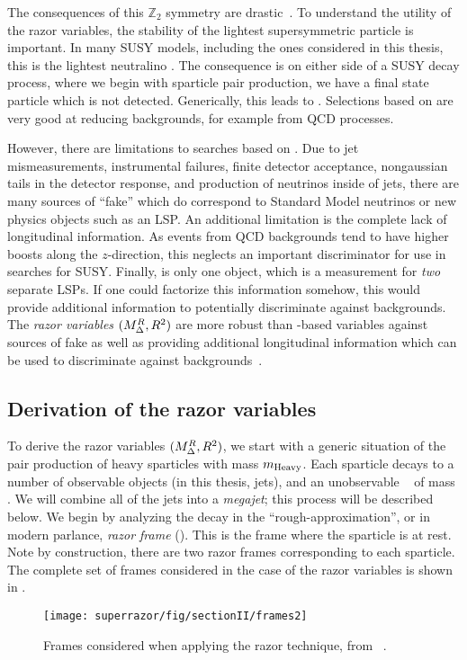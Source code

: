 The consequences of this $\mathbb{Z}_2$ symmetry are drastic~\cite{susyPrimer}.
To understand the utility of the razor variables, the stability of the lightest supersymmetric particle is important.
In many SUSY models, including the ones considered in this thesis, this is the lightest neutralino \lsp.
The consequence is on either side of a SUSY decay process, where we begin with sparticle pair production, we have a final state particle which is not detected.
Generically, this leads to \met.
Selections based on \met are very good at reducing  backgrounds, for example from QCD processes.

However, there are limitations to searches based on \met.
Due to jet mismeasurements, instrumental failures, finite detector acceptance, nongaussian tails in the detector response, and production of neutrinos inside of jets, there are many sources of ``fake'' \met which do correspond to Standard Model neutrinos or new physics objects such as an LSP.
An additional limitation is the complete lack of longitudinal information.
As events from QCD backgrounds tend to have higher boosts along the $z$-direction, this neglects an important discriminator for use in searches for SUSY.
Finally, \met is only one object, which is a measurement for \textit{two} separate LSPs.
If one could factorize this information somehow, this would provide additional information to potentially discriminate against backgrounds.
The \textit{razor variables} $(M_{\Delta}^{R}, R^2)$ are more robust than \met-based variables against sources of fake \met as well as providing additional longitudinal information which can be used to discriminate against backgrounds~\cite{Rogan:2010kb,Buckley:2013kua}.

\subsection{Derivation of the razor variables}

To derive the razor variables $(M_{\Delta}^{R}, R^2)$, we start with a generic situation of the pair production of heavy sparticles with mass $m_{\mathrm{Heavy}}$.\footnotemark
{}
Each sparticle decays to a number of observable objects (in this thesis, jets), and an unobservable \lsp~ of mass \mlsp.
We will combine all of the jets into a \textit{megajet}; this process will be described below.
We begin by analyzing the decay in the ``rough-approximation'', or in modern parlance, \textit{razor frame} (\rframe).
This is the frame where the sparticle is at rest.
Note by construction, there are two razor frames corresponding to each sparticle.
The complete set of frames considered in the case of the razor variables is shown in .
\begin{figure}[tbp]
\caption{Frames considered when applying the razor technique, from ~\cite{Buckley:2013kua}.} \label{fig:razor_frames}
\texttt{[image: superrazor/fig/sectionII/frames2]}
\end{figure}

